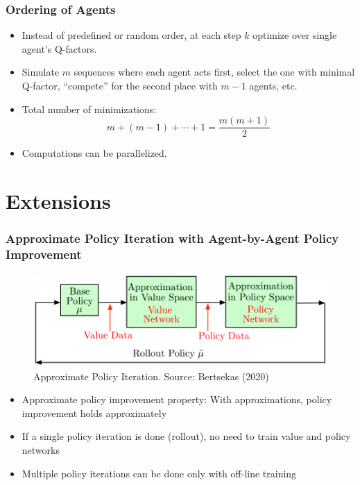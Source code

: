 \documentclass{beamer}
\begin{document}
    \begin{frame}
    	
	\frametitle{Ordering of Agents}
	
	
	
	\begin{itemize}
		\item Instead of predefined or random order, 
		at each step $k$ optimize over single 
		agent's Q-factors.
		
		\item Simulate $m$ sequences where each agent 
		acts first, select the one with minimal Q-factor,
		``compete'' for the second place with $m-1$ agents,
		etc.
				 
		\item Total number of minimizations:
		$$
		m+(m-1)+\cdots+1=\frac{m(m+1)}{2}
		$$
		
		 
		\item Computations can be parallelized.
	\end{itemize}
	
	
	\end{frame}













    \section{Extensions}



    \begin{frame}
	\frametitle{Approximate Policy Iteration with Agent-by-Agent Policy Improvement}
	
	\begin{figure}
		\includegraphics[scale=0.55]{3a_api}
		\caption{Approximate Policy Iteration. Source: Bertsekas (2020)}
	\end{figure}
	
	
	\begin{itemize}
		\item Approximate policy improvement property: With approximations, policy improvement holds approximately
		\item If a single policy iteration is done (rollout), no need to train value and policy networks
		\item Multiple policy iterations can be done only with off-line training
	
	\end{itemize}
\end{frame}
\end{document}

